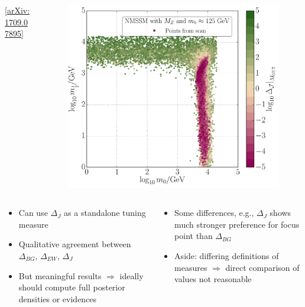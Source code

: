 \documentclass[10pt,aspectratio=169]{beamer}
\begin{document}
\begin{frame}
\begin{columns}[t]
\begin{column}{0.3\textwidth}
\begin{figure}
      \end{figure}
      \vspace{-15pt}
      \begin{center}
        \tiny [\href{http://arxiv.org/abs/1709.07895}{arXiv:1709.07895}]
      \end{center}
    \end{column}
    \begin{column}{0.3\textwidth}
      \begin{figure}
        \centering
        \includegraphics[width=\textwidth]{CNMSSM_GUT_J_mh_m0m12}
      \end{figure}
    \end{column}
  \end{columns}
  \begin{columns}[t]
    \begin{column}{0.5\textwidth}
      \begin{itemize} \itemsep1em
      \item Can use $\Delta_J$ as a standalone tuning measure
      \item {\color{blue}Qualitative agreement between $\Delta_{BG}$,
        $\Delta_{EW}$, $\Delta_J$}
      \item \alert{But meaningful results $\Rightarrow$ ideally
        should compute full posterior densities or evidences}
      \end{itemize}
    \end{column}
    \begin{column}{0.5\textwidth}
      \begin{itemize} \itemsep1em
      \item Some differences, e.g., $\Delta_J$ shows much stronger
        preference for focus point than $\Delta_{BG}$
      \item Aside: differing definitions of measures $\Rightarrow$ direct
        comparison of values not reasonable
      \end{itemize}
    \end{column}
  \end{columns}
\end{frame}
\end{document}

